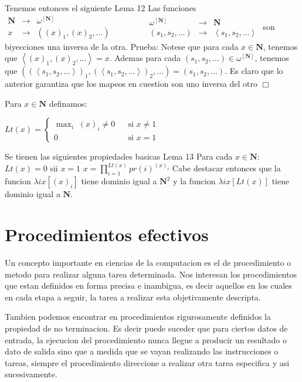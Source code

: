 Tenemos entonces el siguiente
Lema 12 Las funciones
\(\displaystyle \begin{array}{lll} \mathbf{N} & \rightarrow & \omega ^{\left[ \mathbf{N}\right] } \\ x & \rightarrow & ((x)_{1},(x)_{2},...) \end{array} \ \ \ \ \ \ \ \ \ \ \ \ \ \ \ \ \ \ \begin{array}{rll} \omega ^{\left[ \mathbf{N}\right] } & \rightarrow & \mathbf{N} \\ (s_{1},s_{2},...) & \rightarrow & \left\langle s_{1},s_{2},...\right\rangle \end{array} \)
son biyecciones una inversa de la otra.
Prueba: Notese que para cada \(x\in \mathbf{N}\), tenemos que \(\left\langle (x)_{1},(x)_{2},...\right\rangle =x\). Ademas para cada \((s_{1},s_{2},...)\in \omega ^{\left[ \mathbf{N}\right] }\), tenemos que \(((\left\langle s_{1},s_{2},...\right\rangle )_{1},(\left\langle s_{1},s_{2},...\right\rangle )_{2},...)=(s_{1},s_{2},...)\). Es claro que lo anterior garantiza que los mapeos en cuestion son uno inversa del otro \(\Box\)

Para \(x\in \mathbf{N}\) definamos:

\(\displaystyle Lt(x)=\left\{ \begin{array}{lll} \max_{i}\;(x)_{i}\neq 0 & & \text{si }x\neq 1 \\ 0 & & \text{si }x=1 \end{array} \right. \)

Se tienen las siguientes propiedades basicas
Lema 13 Para cada \(x\in \mathbf{N}\):
\(Lt(x)=0\) sii \(x=1\)
\(x=\prod\nolimits_{i=1}^{Lt(x)}pr(i)^{(x)_{i}}\)
Cabe destacar entonces que la funcion \(\lambda ix[(x)_{i}]\) tiene dominio igual a \(\mathbf{N}^{2}\) y la funcion \(\lambda ix[Lt(x)]\) tiene dominio igual a \(\mathbf{N}\).

\section{Procedimientos efectivos}

Un concepto importante en ciencias de la computacion es el de procedimiento o metodo para realizar alguna tarea determinada. Nos interesan los procedimientos que estan definidos en forma precisa e inambigua, es decir aquellos en los cuales en cada etapa a seguir, la tarea a realizar esta objetivamente descripta.

Tambien podemos encontrar en procedimientos rigurosamente definidos la propiedad de no terminacion. Es decir puede suceder que para ciertos datos de entrada, la ejecucion del procedimiento nunca llegue a producir un resultado o dato de salida sino que a medida que se vayan realizando las instrucciones o tareas, siempre el procedimiento direccione a realizar otra tarea especifica y asi sucesivamente.

